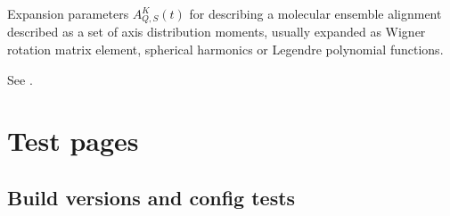 \documentclass[letterpaper,table,10pt,english]{jupyterBook}
\begin{document}
\begin{description}
\sphinxAtStartPar
Expansion parameters \(A_{Q,S}^{K}(t)\) for describing a molecular ensemble alignment described as a set of axis distribution moments, usually expanded as Wigner rotation matrix element, spherical harmonics or Legendre polynomial functions.

\sphinxAtStartPar
See {\hyperref[\detokenize{backmatter/glossary:term-ADMs}]{}}.

\end{description}

\sphinxstepscope


\part{Test pages}

\sphinxstepscope


\chapter{Build versions and config tests}
\label{\detokenize{tests/build_versions_checks:build-versions-and-config-tests}}\label{\detokenize{tests/build_versions_checks::doc}}
\end{document}
